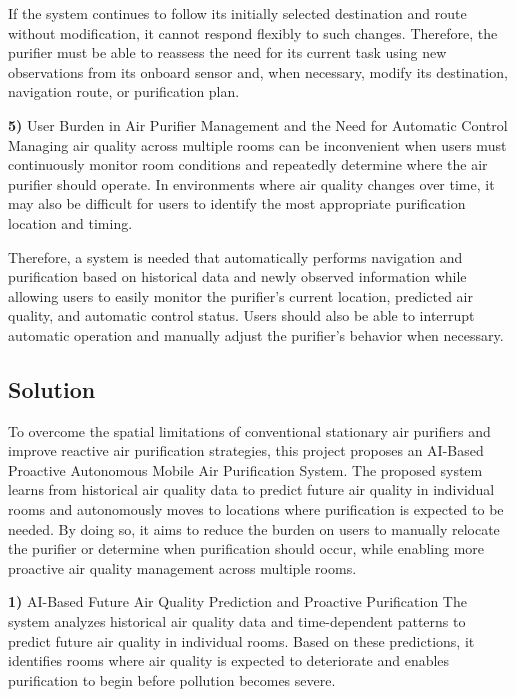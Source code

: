 \documentclass[conference]{IEEEtran}
\begin{document}
If the system continues to follow its initially selected destination and route without modification, it cannot respond flexibly to such changes. Therefore, the purifier must be able to reassess the need for its current task using new observations from its onboard sensor and, when necessary, modify its destination, navigation route, or purification plan.

\par\noindent\textbf{5)} User Burden in Air Purifier Management and the Need for Automatic Control
Managing air quality across multiple rooms can be inconvenient when users must continuously monitor room conditions and repeatedly determine where the air purifier should operate. In environments where air quality changes over time, it may also be difficult for users to identify the most appropriate purification location and timing.

Therefore, a system is needed that automatically performs navigation and purification based on historical data and newly observed information while allowing users to easily monitor the purifier's current location, predicted air quality, and automatic control status. Users should also be able to interrupt automatic operation and manually adjust the purifier's behavior when necessary.

\subsection{Solution}
To overcome the spatial limitations of conventional stationary air purifiers and improve reactive air purification strategies, this project proposes an AI-Based Proactive Autonomous Mobile Air Purification System. The proposed system learns from historical air quality data to predict future air quality in individual rooms and autonomously moves to locations where purification is expected to be needed. By doing so, it aims to reduce the burden on users to manually relocate the purifier or determine when purification should occur, while enabling more proactive air quality management across multiple rooms.

\par\noindent\textbf{1)} AI-Based Future Air Quality Prediction and Proactive Purification
The system analyzes historical air quality data and time-dependent patterns to predict future air quality in individual rooms. Based on these predictions, it identifies rooms where air quality is expected to deteriorate and enables purification to begin before pollution becomes severe.
\end{document}
